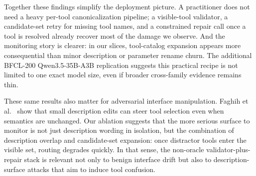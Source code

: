 \documentclass[runningheads]{llncs}
\begin{document}
Together these findings simplify the deployment picture. A practitioner does not
need a heavy per-tool canonicalization pipeline; a visible-tool validator, a
candidate-set retry for missing tool names, and a constrained repair call once a
tool is resolved already recover most of the damage we observe. And the monitoring
story is clearer: in our slices, tool-catalog expansion appears more consequential
than minor description or parameter rename churn. The additional BFCL-200
Qwen3.5-35B-A3B replication suggests this practical recipe is not limited to one
exact model size, even if broader cross-family evidence remains thin.

These same results also matter for adversarial interface manipulation. Faghih
et al.~\cite{faghih2025gaming} show that small description edits can steer tool
selection even when semantics are unchanged. Our ablation suggests that the more
serious surface to monitor is not just description wording in isolation, but the
combination of description overlap and candidate-set expansion: once distractor
tools enter the visible set, routing degrades quickly. In that sense, the
non-oracle validator-plus-repair stack is relevant not only to benign interface
drift but also to description-surface attacks that aim to induce tool confusion.
\end{document}
